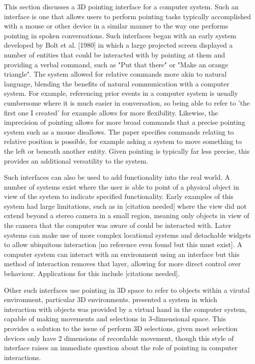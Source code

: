 This section discusses a 3D pointing interface for a computer system. Such an interface is one that allows users to perform pointing tasks typically accomplished with a mouse or other device in a similar manner to the way one performs pointing in spoken conversations. Such interfaces began with an early system developed by Bolt et al. [1980] in which a large projected screen displayed a number of entities that could be interacted with by pointing at them and providing a verbal command, such as "Put that there" or "Make an orange triangle". The system allowed for relative commands more akin to natural language, blending the benefits of natural communication with a computer system. For example, referencing prior events in a computer system is usually cumbersome where it is much easier in conversation, so being able to refer to 'the first one I created' for example allows for more flexibility. Likewise, the imprecision of pointing allows for more broad commands that a precise pointing system such as a mouse disallows. The paper specifies commands relating to relative position is possible, for example asking a system to move something to the left or beneath another entity. Given pointing is typically far less precise, this provides an additional versatility to the system.

Such interfaces can also be used to add functionality into the real world. A number of systems exist where the user is able to point of a physical object in view of the system to indicate specified functionality. Early examples of this system had large limitations, such as in [citation needed] where the view did not extend beyond a stereo camera in a small region, meaning only objects in view of the camera that the computer was aware of could be interacted with. Later systems can make use of more complex locational systems and detachable widgets to allow ubiquitous interaction [no reference even found but this must exist]. A computer system can interact with an environment using an interface but this method of interaction removes that layer, allowing for more direct control over behaviour. Applications for this include [citations needed]. 

Other such interfaces use pointing in 3D space to refer to objects within a virutal environment, particular 3D environments.  presented a system in which interaction with objects was provided by a virtual hand in the computer system, capable of making movements and selections in 3-dimensional space. This provides a solution to the issue of perform 3D selections, given most selection devices only have 2 dimensions of recordable movement, though this style of interface raises an immediate question about the role of pointing in computer interactions.

